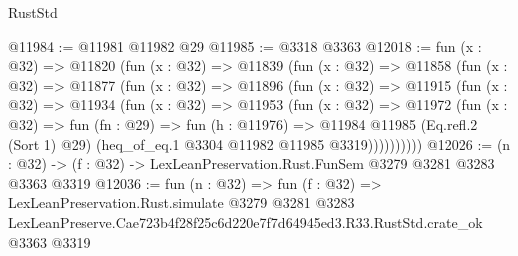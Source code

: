 \begin{lexlean}{RustStd}
\begin{coremodule}
@11984 := @11981 @11982 @29
@11985 := @3318 @3363
@12018 := fun (x : @32) =>
  @11820
    (fun (x : @32) =>
    @11839
      (fun (x : @32) =>
      @11858
        (fun (x : @32) =>
        @11877
          (fun (x : @32) =>
          @11896
            (fun (x : @32) =>
            @11915
              (fun (x : @32) =>
              @11934
                (fun (x : @32) =>
                @11953
                  (fun (x : @32) =>
                  @11972
                    (fun (x : @32) =>
                    fun (fn : @29) =>
                    fun (h : @11976) =>
                    @11984
                      @11985
                      (Eq.refl.{2} (Sort 1) @29)
                      (heq_of_eq.{1} @3304 @11982 @11985 @3319))))))))))
@12026 := (n : @32) -> (f : @32) -> LexLeanPreservation.Rust.FunSem @3279 @3281 @3283 @3363 @3319
@12036 := fun (n : @32) =>
  fun (f : @32) =>
  LexLeanPreservation.Rust.simulate
    @3279
    @3281
    @3283
    LexLeanPreserve.Cae723b4f28f25c6d220e7f7d64945ed3.R33.RustStd.crate_ok
    @3363
    @3319
\end{coremodule}
\end{lexlean}
